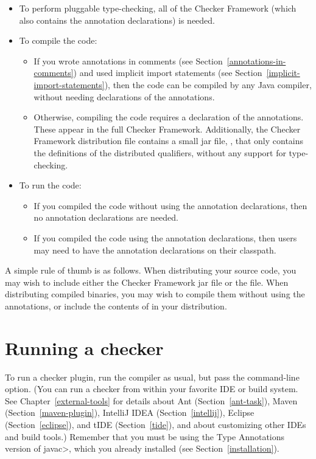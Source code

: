 \begin{itemize}
\item
To perform pluggable type-checking, all of the Checker Framework (which
also contains the annotation declarations) is needed.
\item
To compile the code:
\begin{itemize}
\item
  If you wrote annotations in comments (see
  Section~\ref{annotations-in-comments}) and used implicit import
  statements (see Section~\ref{implicit-import-statements}), then the code
  can be compiled by any Java compiler, without needing declarations of the
  annotations.
\item
  Otherwise, compiling the code requires a declaration of the annotations.
  These appear in the full Checker Framework.  Additionally, the Checker
  Framework distribution  file contains a small jar file,
  , that only contains the definitions of the
  distributed qualifiers, without any support for type-checking.
\end{itemize}
\item
To run the code:
\begin{itemize}
\item
  If you compiled the code without using the annotation declarations, then
  no annotation declarations are needed.
\item
  If you compiled the code using the annotation declarations, then users
  may need to have the annotation declarations on their classpath.
\end{itemize}
\end{itemize}

A simple rule of thumb is as follows.  When distributing your source code,
you may wish to include either the Checker Framework jar file or the
 file.  When distributing compiled binaries, you
may wish to compile them without using the annotations, or include the
contents of  in your distribution.


\section{Running a checker\label{running}}

To run a checker plugin, run the compiler  as usual,
but pass the  command-line
option.
(You can run a checker from within your favorite IDE or build system.  See
Chapter~\ref{external-tools} for details about
Ant (Section~\ref{ant-task}),
Maven (Section~\ref{maven-plugin}),
IntelliJ IDEA (Section~\ref{intellij}),
Eclipse (Section~\ref{eclipse}),
and
tIDE (Section~\ref{tide}), and about customizing other IDEs and build tools.)
Remember that you must be using the
Type Annotations version of \<javac>, which you already installed (see Section~\ref{installation}).

